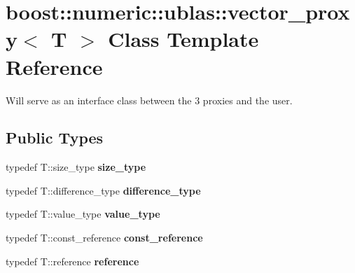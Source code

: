 \hypertarget{classboost_1_1numeric_1_1ublas_1_1vector__proxy}{}\section{boost\+:\+:numeric\+:\+:ublas\+:\+:vector\+\_\+proxy$<$ T $>$ Class Template Reference}
\label{classboost_1_1numeric_1_1ublas_1_1vector__proxy}


Will serve as an interface class between the 3 proxies and the user.  


\subsection*{Public Types}
\begin{DoxyCompactItemize}
\item 
typedef T\+::size\+\_\+type {\bfseries size\+\_\+type}\hypertarget{classboost_1_1numeric_1_1ublas_1_1vector__proxy_a4ea16933b64c4075bcdee2298ab1b11a}{}\label{classboost_1_1numeric_1_1ublas_1_1vector__proxy_a4ea16933b64c4075bcdee2298ab1b11a}

\item 
typedef T\+::difference\+\_\+type {\bfseries difference\+\_\+type}\hypertarget{classboost_1_1numeric_1_1ublas_1_1vector__proxy_ad030a4a516d8b6eb2d467af2a6fe8ec5}{}\label{classboost_1_1numeric_1_1ublas_1_1vector__proxy_ad030a4a516d8b6eb2d467af2a6fe8ec5}

\item 
typedef T\+::value\+\_\+type {\bfseries value\+\_\+type}\hypertarget{classboost_1_1numeric_1_1ublas_1_1vector__proxy_a61bef8c6490e69f94095186b0b1409e0}{}\label{classboost_1_1numeric_1_1ublas_1_1vector__proxy_a61bef8c6490e69f94095186b0b1409e0}

\item 
typedef T\+::const\+\_\+reference {\bfseries const\+\_\+reference}\hypertarget{classboost_1_1numeric_1_1ublas_1_1vector__proxy_ae5b208fd787cd64034fae0d362198e76}{}\label{classboost_1_1numeric_1_1ublas_1_1vector__proxy_ae5b208fd787cd64034fae0d362198e76}

\item 
typedef T\+::reference {\bfseries reference}\hypertarget{classboost_1_1numeric_1_1ublas_1_1vector__proxy_a71ce5967fa951495f9a201a6b2f17e88}{}\label{classboost_1_1numeric_1_1ublas_1_1vector__proxy_a71ce5967fa951495f9a201a6b2f17e88}

\end{DoxyCompactItemize}
